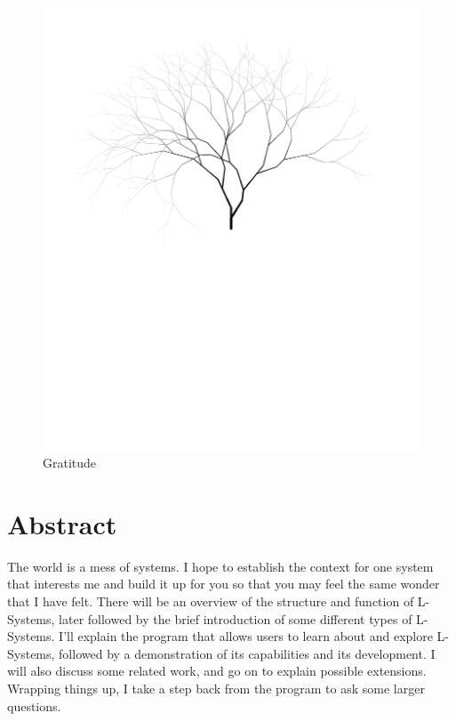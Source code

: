 \documentclass[12pt,twoside]{reedthesis}
\begin{document}
	\begin{figure}[h]
	\centering
	\includegraphics[clip=true, viewport=1in 5.5in 9in 11in, scale=0.44]{Images/Acknowledgements1}
	\caption[Gratitude]{Gratitude\footnotemark}
	\label {Acknowledgements1}
	\end{figure}
	


    \tableofcontents
	\listoffigures

\chapter*{Abstract}
	The world is a mess of systems. I hope to establish the context for one system that interests me and build it up for you so that you may feel the same wonder that I have felt. There will be an overview of the structure and function of L-Systems, later followed by the brief introduction of some different types of L-Systems. I'll explain the program that allows users to learn about and explore L-Systems, followed by a demonstration of its capabilities and its development. I will also discuss some related work, and go on to explain possible extensions. Wrapping things up, I take a step back from the program to ask some larger questions.
	
\end{document}
